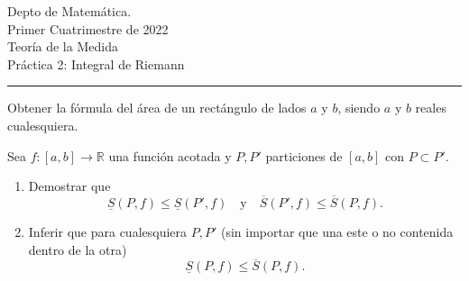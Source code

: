 \documentclass{book}
\begin{document}


\begin{large}
\begin{bfseries} %
        \noindent Depto de Matem\'atica.\\
        Primer Cuatrimestre de 2022\\                                                                                                                                                                                                                                                                                                                                                
        Teoría de la Medida \\
        Práctica 2: Integral de Riemann

\end{bfseries}
\end{large}
\par\noindent\rule{\textwidth}{.5pt}





\begin{ejer}{} Obtener la fórmula del área de un rect\'angulo de lados $a$ y $b$, siendo $a$ y $b$ reales cualesquiera.
\end{ejer}



 

\begin{ejer}{} 
Sea $f:[a,b]\to\mathbb{R}$ una función acotada y $P,P'$ particiones de $[a,b]$ con $P\subset P'$. 
\begin{enumerate}
\item Demostrar que 
  \[
  \underline{S}(P,f)\leq \underline{S}(P',f)\quad\text{y}\quad \overline{S}(P',f)\leq \overline{S}(P,f).
 \]
 \item 
 
 Inferir que para cualesquiera $P,P'$ (sin importar que una este o no contenida dentro de la otra)
   \[
\underline{S}(P,f)\leq \overline{S}(P,f).
 \]

\end{enumerate}
\end{ejer}  
\end{document}
